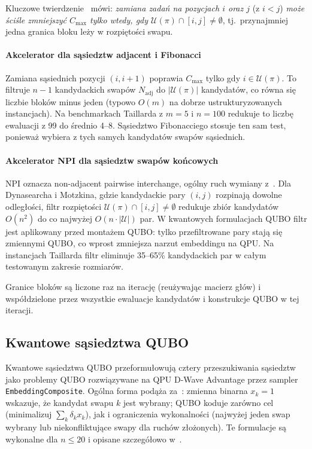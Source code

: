 \documentclass[11pt,a4paper]{article}
\begin{document}
Kluczowe twierdzenie~\citep{ref_smutnicki} mówi: \emph{zamiana zadań na
pozycjach $i$ oraz $j$} (z $i<j$) \emph{może ściśle zmniejszyć
$C_{\max}$ tylko wtedy, gdy $\mathcal U(\pi)\cap[i,j]\neq\emptyset$},
tj.\ przynajmniej jedna granica bloku leży w rozpiętości swapu.

\paragraph{Akcelerator dla sąsiedztw adjacent i Fibonacci}
Zamiana sąsiednich pozycji $(i,i+1)$ poprawia $C_{\max}$ tylko gdy
$i\in\mathcal U(\pi)$. To filtruje $n-1$ kandydackich swapów
$N_{\mathrm{adj}}$ do $|\mathcal U(\pi)|$ kandydatów, co równa się
liczbie bloków minus jeden (typowo $O(m)$ na dobrze ustrukturyzowanych
instancjach). Na benchmarkach Taillarda z $m=5$ i $n=100$ redukuje to
liczbę ewaluacji z 99 do średnio 4--8. Sąsiedztwo Fibonacciego stosuje
ten sam test, ponieważ wybiera z tych samych kandydatów swapów
sąsiednich.

\paragraph{Akcelerator NPI dla sąsiedztw swapów końcowych}
NPI oznacza non-adjacent pairwise interchange, ogólny ruch wymiany
z~\citep{dellacroce95}. Dla Dynasearcha i Motzkina, gdzie kandydackie
pary $(i,j)$ rozpinają dowolne odległości, filtr rozpiętości
$\mathcal U(\pi)\cap[i,j]\neq\emptyset$ redukuje zbiór kandydatów
$O(n^2)$ do co najwyżej $O(n\cdot|\mathcal U|)$ par. W kwantowych
formulacjach QUBO filtr jest aplikowany przed montażem QUBO: tylko
przefiltrowane pary stają się zmiennymi QUBO, co wprost zmniejsza
narzut embeddingu na QPU. Na instancjach Taillarda filtr eliminuje
35--65\% kandydackich par w całym testowanym zakresie rozmiarów.

Granice bloków są liczone raz na iterację (reużywając macierz głów)
i współdzielone przez wszystkie ewaluacje kandydatów i konstrukcje QUBO
w tej iteracji.

\subsection{Kwantowe sąsiedztwa QUBO}

Kwantowe sąsiedztwa QUBO przeformułowują cztery
przeszukiwania sąsiedztw jako problemy QUBO rozwiązywane na QPU D-Wave
Advantage przez sampler \texttt{EmbeddingComposite}. Ogólna forma
podąża za~\citep{WojewodzkiBozejkoBPASTS2026}: zmienna binarna $x_k=1$
wskazuje, że kandydat swapu $k$ jest wybrany; QUBO koduje zarówno cel
(minimalizuj $\sum_k\delta_kx_k$), jak i ograniczenia wykonalności
(najwyżej jeden swap wybrany lub niekonfliktujące swapy dla ruchów
złożonych). Te formulacje są wykonalne dla $n\le20$ i opisane
szczegółowo w~\citep{WojewodzkiBozejkoBPASTS2026}.
\end{document}
